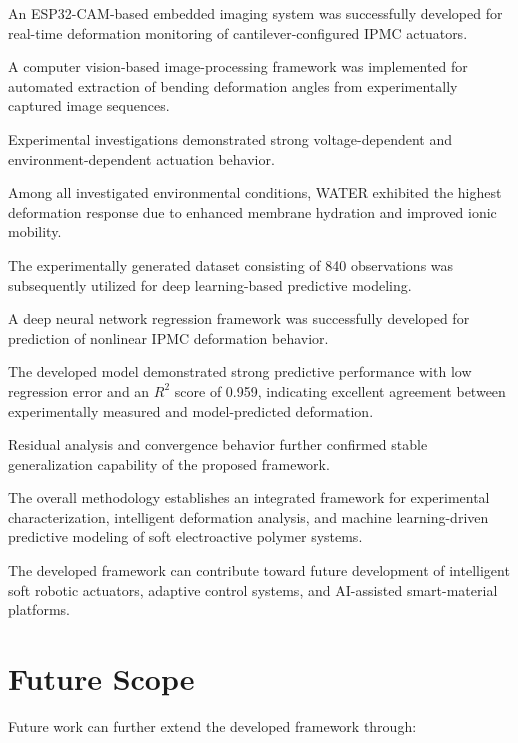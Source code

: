 \documentclass[11pt,a4paper]{article}
\begin{document}
An ESP32-CAM-based embedded imaging system was successfully developed for real-time deformation monitoring of cantilever-configured IPMC actuators.

A computer vision-based image-processing framework was implemented for automated extraction of bending deformation angles from experimentally captured image sequences.

Experimental investigations demonstrated strong voltage-dependent and environment-dependent actuation behavior.

Among all investigated environmental conditions, WATER exhibited the highest deformation response due to enhanced membrane hydration and improved ionic mobility.

The experimentally generated dataset consisting of 840 observations was subsequently utilized for deep learning-based predictive modeling.

A deep neural network regression framework was successfully developed for prediction of nonlinear IPMC deformation behavior.

The developed model demonstrated strong predictive performance with low regression error and an $R^2$ score of 0.959, indicating excellent agreement between experimentally measured and model-predicted deformation.

Residual analysis and convergence behavior further confirmed stable generalization capability of the proposed framework.

The overall methodology establishes an integrated framework for experimental characterization, intelligent deformation analysis, and machine learning-driven predictive modeling of soft electroactive polymer systems.

The developed framework can contribute toward future development of intelligent soft robotic actuators, adaptive control systems, and AI-assisted smart-material platforms.


\section*{Future Scope}


Future work can further extend the developed framework through:
\end{document}
